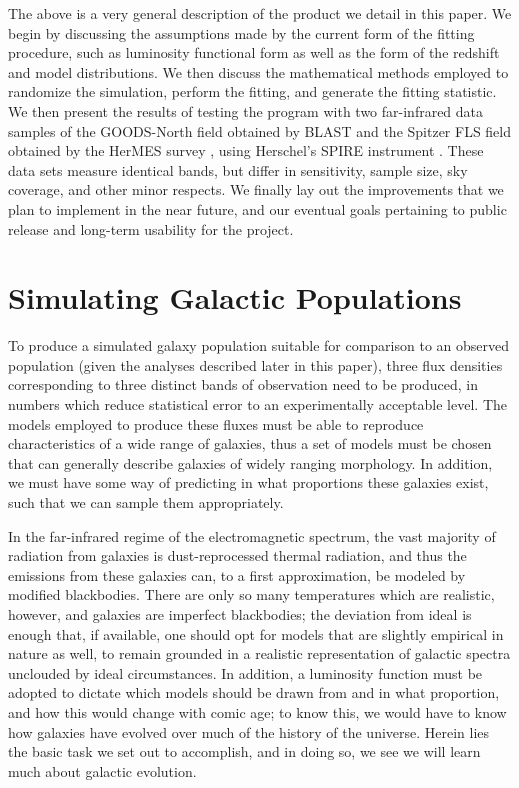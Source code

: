 \documentclass[twocolumn,letterpaper,10pt]{article}
\begin{document}
The above is a very general description of the product we detail in this paper. We begin by discussing the assumptions made by the current form of the fitting procedure, such as luminosity functional form as well as the form of the redshift and model distributions. We then discuss the mathematical methods employed to randomize the simulation, perform the fitting, and generate the fitting statistic. We then present the results of testing the program with two far-infrared data samples of the GOODS-North field obtained by BLAST \citep{BLAST} and the Spitzer FLS field obtained by the HerMES survey \citep{HerMES}, using Herschel's SPIRE instrument \citep{Herschel,SPIRE}. These data sets measure identical bands, but differ in sensitivity, sample size, sky coverage, and other minor respects. We finally lay out the improvements that we plan to implement in the near future, and our eventual goals pertaining to public release and long-term usability for the project. 

\section{Simulating Galactic Populations}

To produce a simulated galaxy population suitable for comparison to an observed population (given the analyses described later in this paper), three flux densities corresponding to three distinct bands of observation need to be produced, in numbers which reduce statistical error to an experimentally acceptable level. The models employed to produce these fluxes must be able to reproduce characteristics of a wide range of galaxies, thus a set of models must be chosen that can generally describe galaxies of widely ranging morphology. In addition, we must have some way of predicting in what proportions these galaxies exist, such that we can sample them appropriately. 

In the far-infrared regime of the electromagnetic spectrum, the vast majority of radiation from galaxies is dust-reprocessed thermal radiation, and thus the emissions from these galaxies can, to a first approximation, be modeled by modified blackbodies. There are only so many temperatures which are realistic, however, and galaxies are imperfect blackbodies; the deviation from ideal is enough that, if available, one should opt for models that are slightly empirical in nature as well, to remain grounded in a realistic representation of galactic spectra unclouded by ideal circumstances. In addition, a luminosity function must be adopted to dictate which models should be drawn from and in what proportion, and how this would change with comic age; to know this, we would have to know how galaxies have evolved over much of the history of the universe. Herein lies the basic task we set out to accomplish, and in doing so, we see we will learn much about galactic evolution.
\end{document}
